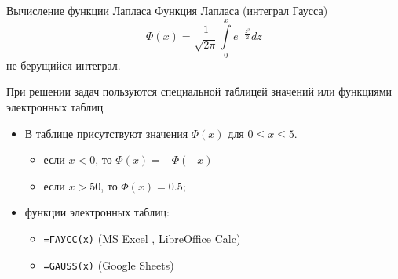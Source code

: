 \documentclass[unicode,11pt,notheorems,xcolor=table]{beamer}
\begin{document}
\begin{frame}{Вычисление функции Лапласа}{}
    Функция Лапласа (интеграл Гаусса)
    $$
        \Phi(x) = \frac{1}{\sqrt{2\pi}}\int\limits_0^x e^{-\frac{z^2}{2}}dz
    $$
    не берущийся интеграл.

    \bigskip

    При решении задач пользуются специальной таблицей значений или функциями электронных таблиц

    \begin{itemize}
        \item В \href{https://cloud.mail.ru/public/3hfk/5Ey4LLdoi}{таблице} присутствуют значения $\Phi(x)$ для $0\leqslant x \leqslant 5$.
        \begin{itemize}
            \item если $x<0$,  то $\Phi(x)= -\Phi(-x)$\hfill {}
            \item если $x>50$, то $\Phi(x)= 0.5$;
        \end{itemize}
        \item функции электронных таблиц:
        \begin{itemize}
            \item \texttt{=ГАУСС(x)} \hfill (MS Excel , LibreOffice Calc)
            \item \texttt{=GAUSS(x)} \hfill (Google Sheets)
        \end{itemize}
        \end{itemize}
\end{frame}

\begin{frame}{}
\end{frame}
\end{document}
